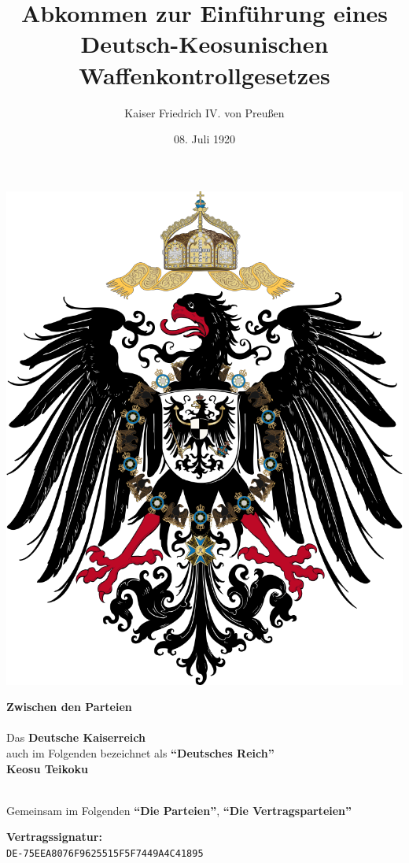 \documentclass{article}
\title{Abkommen zur Einführung eines Deutsch-Keosunischen Waffenkontrollgesetzes}
\author{Kaiser Friedrich IV. von Preußen}
\date{08. Juli 1920}
\begin{document}
\maketitle
\begin{center}
    \includegraphics[scale=.15]{dr_wappen}
\end{center}
\begin{center}
    \textbf{Zwischen den Parteien\\}\textbf{\\}
    Das \textbf{Deutsche Kaiserreich\\} auch im Folgenden bezeichnet als \textbf{``Deutsches Reich''\\}
    \textbf{Keosu Teikoku\\}\textbf{\\}

    Gemeinsam im Folgenden \textbf{``Die Parteien''}, \textbf{``Die Vertragsparteien''}
\end{center}
\newpage
{}
\vspace*{\fill}
\begin{Center}
\textbf{Vertragssignatur:\\}
\texttt{DE-75EEA8076F9625515F5F7449A4C41895}
\vspace*{\fill}
\end{Center}
\newpage
\tableofcontents
\newpage
\end{document}

